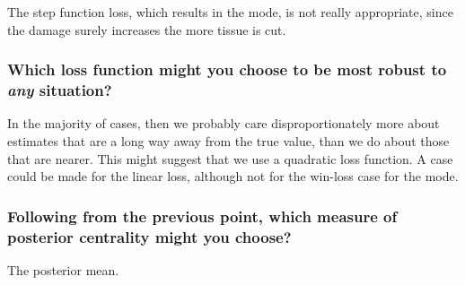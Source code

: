 \documentclass[11pt,fullpage]{book}
\begin{document}
The step function loss, which results in the mode, is not really appropriate, since the damage surely increases the more tissue is cut.

\subsubsection{Which loss function might you choose to be most robust to \textit{any} situation?}
In the majority of cases, then we probably care disproportionately more about estimates that are a long way away from the true value, than we do about those that are nearer. This might suggest that we use a quadratic loss function. A case could be made for the linear loss, although not for the win-loss case for the mode.

\subsubsection{Following from the previous point, which measure of posterior centrality might you choose?}
The posterior mean.
\end{document}

